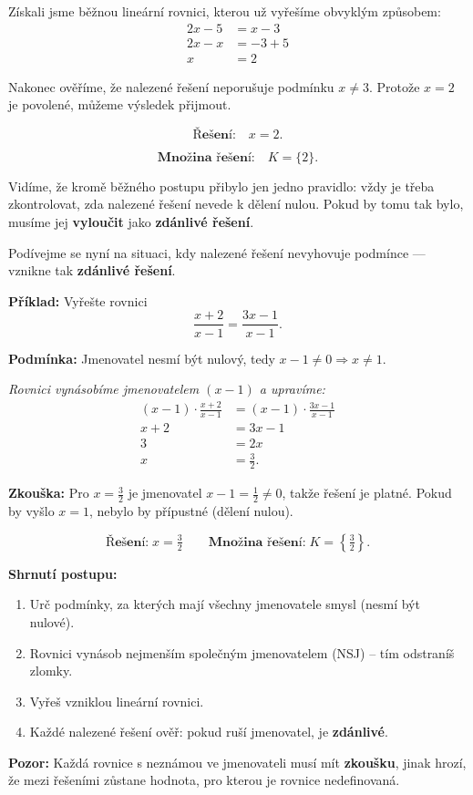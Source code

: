 \documentclass[12pt,a4paper]{article}
\begin{document}
Získali jsme běžnou lineární rovnici, kterou už vyřešíme obvyklým způsobem:
\begin{align*}
  2x - 5 &= x - 3 \\
  2x - x &= -3 + 5 \\
  x &= 2
\end{align*}

Nakonec ověříme, že nalezené řešení neporušuje podmínku \(x \neq 3\).  
Protože \(x = 2\) je povolené, můžeme výsledek přijmout.

\[
\textbf{Řešení:} \quad x = 2.
\]

\[
\textbf{Množina řešení:} \quad K = \{2\}.
\]

\medskip
Vidíme, že kromě běžného postupu přibylo jen jedno pravidlo:  
vždy je třeba zkontrolovat, zda nalezené řešení nevede k dělení nulou.  
Pokud by tomu tak bylo, musíme jej \textbf{vyloučit} jako \textbf{zdánlivé řešení}.

\medskip
Podívejme se nyní na situaci, kdy nalezené řešení nevyhovuje podmínce — vznikne tak \textbf{zdánlivé řešení}.

\begin{examplebox}
\textbf{Příklad:}  
Vyřešte rovnici
\[
\frac{x + 2}{x - 1} = \frac{3x - 1}{x - 1}.
\]

\textbf{Podmínka:}  
Jmenovatel nesmí být nulový, tedy \(x - 1 \neq 0 \Rightarrow x \neq 1.\)

\textit{Rovnici vynásobíme jmenovatelem \((x - 1)\) a upravíme:}
\begin{align*}
(x - 1)\cdot \frac{x + 2}{x - 1} &= (x - 1)\cdot \frac{3x - 1}{x - 1}\\[-2pt]
x + 2 &= 3x - 1\\
3 &= 2x\\
x &= \tfrac{3}{2}.
\end{align*}

\textbf{Zkouška:}  
Pro \(x = \tfrac{3}{2}\) je jmenovatel \(x - 1 = \tfrac{1}{2} \neq 0\), takže řešení je platné.  
Pokud by vyšlo \(x = 1\), nebylo by přípustné (dělení nulou).

\[
\textbf{Řešení:}\; x = \tfrac{3}{2} \qquad
\textbf{Množina řešení:}\; K = \left\{\tfrac{3}{2}\right\}.
\]
\end{examplebox}


\begin{notebox}
\textbf{Shrnutí postupu:}
\begin{enumerate}
  \item Urč podmínky, za kterých mají všechny jmenovatele smysl (nesmí být nulové).
  \item Rovnici vynásob nejmenším společným jmenovatelem (NSJ) – tím odstraníš zlomky.
  \item Vyřeš vzniklou lineární rovnici.
  \item Každé nalezené řešení ověř: pokud ruší jmenovatel, je \textbf{zdánlivé}.
\end{enumerate}

\textbf{Pozor:} Každá rovnice s neznámou ve jmenovateli musí mít \textbf{zkoušku},  
jinak hrozí, že mezi řešeními zůstane hodnota, pro kterou je rovnice nedefinovaná.
\end{notebox}
\end{document}
